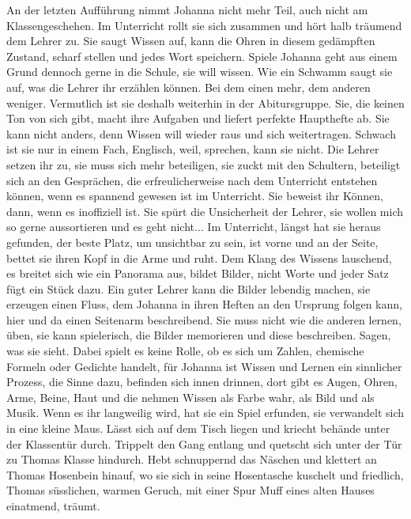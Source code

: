 An der letzten Aufführung nimmt Johanna nicht mehr Teil, auch nicht am Klassengeschehen. Im Unterricht rollt sie sich zusammen und hört halb träumend dem Lehrer zu. Sie saugt Wissen auf, kann die Ohren in diesem gedämpften Zustand, scharf stellen und jedes Wort speichern. 
Spiele
Johanna geht aus einem Grund dennoch gerne in die Schule, sie will wissen. Wie ein Schwamm saugt sie auf, was die Lehrer ihr erzählen können. Bei dem einen mehr, dem anderen weniger. Vermutlich ist sie deshalb weiterhin in der Abitursgruppe. Sie, die keinen Ton von sich gibt, macht ihre Aufgaben und liefert perfekte Haupthefte ab. Sie kann nicht anders, denn Wissen will wieder raus und sich weitertragen. Schwach ist sie nur in einem Fach, Englisch, weil, sprechen, kann sie nicht. Die Lehrer setzen ihr zu, sie muss sich mehr beteiligen, sie zuckt mit den Schultern, beteiligt sich an den Gesprächen, die erfreulicherweise nach dem Unterricht entstehen können, wenn es spannend gewesen ist im Unterricht. Sie beweist ihr Können, dann, wenn es inoffiziell ist. Sie spürt die Unsicherheit der Lehrer, sie wollen mich so gerne aussortieren und es geht nicht...
Im Unterricht, längst hat sie heraus gefunden, der beste Platz, um unsichtbar zu sein, ist vorne und an der Seite, bettet sie ihren Kopf in die Arme und ruht. Dem Klang des Wissens lauschend, es breitet sich wie ein Panorama aus, bildet Bilder, nicht Worte und jeder Satz fügt ein Stück dazu. Ein guter Lehrer kann die Bilder lebendig machen, sie erzeugen einen Fluss, dem Johanna in ihren Heften an den Ursprung folgen kann, hier und da einen Seitenarm beschreibend. Sie muss nicht wie die anderen lernen, üben, sie kann spielerisch, die Bilder memorieren und diese beschreiben. Sagen, was sie sieht. Dabei spielt es keine Rolle, ob es sich um Zahlen, chemische Formeln oder Gedichte handelt, für Johanna ist Wissen und Lernen ein sinnlicher Prozess, die Sinne dazu, befinden sich innen drinnen, dort gibt es Augen, Ohren, Arme, Beine, Haut und die nehmen Wissen als Farbe wahr, als Bild  und als Musik.
Wenn es ihr langweilig wird, hat sie ein Spiel erfunden, sie verwandelt sich in eine kleine Maus. Lässt sich auf dem Tisch liegen und kriecht behände unter der Klassentür durch. Trippelt den Gang entlang und quetscht sich unter der Tür zu Thomas Klasse hindurch. Hebt schnuppernd das Näschen und klettert an Thomas Hosenbein hinauf, wo sie sich in seine Hosentasche kuschelt und friedlich, Thomas süsslichen, warmen Geruch, mit einer Spur Muff eines alten Hauses einatmend, träumt. 
